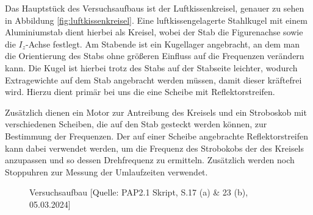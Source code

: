 \documentclass{article}
\begin{document}
Das Hauptstück des Versuchsaufbaus ist der Luftkissenkreisel, genauer zu sehen in Abbildung \ref{fig:luftkissenkreisel}. Eine luftkissengelagerte Stahlkugel mit einem Aluminiumstab dient hierbei als Kreisel, wobei der Stab die Figurenachse sowie die $I_z$-Achse festlegt. Am Stabende ist ein Kugellager angebracht, an dem man die Orientierung des Stabs ohne größeren Einfluss auf die Frequenzen verändern kann. Die Kugel ist hierbei trotz des Stabs auf der Stabseite leichter, wodurch Extragewichte auf dem Stab angebracht werden müssen, damit dieser kräftefrei wird. Hierzu dient primär bei uns die eine Scheibe mit Reflektorstreifen.

Zusätzlich dienen ein Motor zur Antreibung des Kreisels und ein Stroboskob mit verschiedenen Scheiben, die auf den Stab gesteckt werden können, zur Bestimmung der Frequenzen. Der auf einer Scheibe angebrachte Reflektorstreifen kann dabei verwendet werden, um die Frequenz des Strobokobs der des Kreisels anzupassen und so dessen Drehfrequenz zu ermitteln. Zusätzlich werden noch Stoppuhren zur Messung der Umlaufzeiten verwendet.  

\phantom{.}

\begin{figure}[!h]
  \centering
  \hfill
  \hfill
  \caption{Versuchsaufbau [Quelle: PAP2.1 Skript, S.17 (a) \& 23 (b), 05.03.2024]}
  \label{fig:aufbau}
\end{figure}
\end{document}
